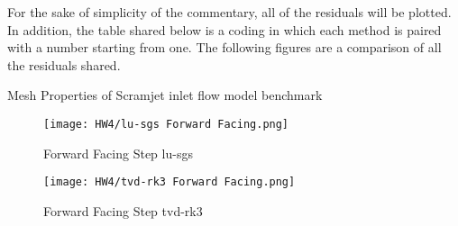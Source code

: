 \documentclass[a4paper, 12pt]{article}
\begin{document}
\par
For the sake of simplicity of the commentary, all of the residuals will be plotted. In addition, the table shared below is a coding in which each method is paired with a number starting from one. The following figures are a comparison of all the residuals shared.

\begin{table}[H]
    \renewcommand\baselinestretch{1.1}\selectfont
    \centering
    \mbox{}
    \caption{Mesh Properties of Scramjet inlet flow model benchmark}
\end{table}

\begin{figure}[H]
    \centering
    \texttt{[image: HW4/lu-sgs Forward Facing.png]}
    \caption{Forward Facing Step lu-sgs}
\end{figure}
\begin{figure}[H]
    \centering
    \texttt{[image: HW4/tvd-rk3 Forward Facing.png]}
    \caption{Forward Facing Step tvd-rk3}
\end{figure}
\end{document}
